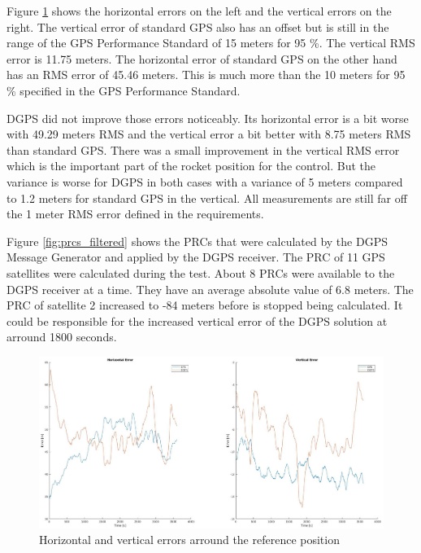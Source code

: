 Figure \ref{fig:horizontal_vertical_error} shows the horizontal errors on the left and the vertical errors on the right.
The vertical error of standard GPS also has an offset but is still in the range of the GPS Performance Standard \cite{SPS_Performance} of 15 meters for 95 \%.
The vertical RMS error is 11.75 meters.
The horizontal error of standard GPS on the other hand has an RMS error of 45.46 meters.
This is much more than the 10 meters for 95 \% specified in the GPS Performance Standard.

DGPS did not improve those errors noticeably.
Its horizontal error is a bit worse with 49.29 meters RMS and the vertical error a bit better with 8.75 meters RMS than standard GPS.
There was a small improvement in the vertical RMS error which is the important part of the rocket position for the control.
But the variance is worse for DGPS in both cases with a variance of 5 meters compared to 1.2 meters for standard GPS in the vertical.
All measurements are still far off the 1 meter RMS error defined in the requirements.

Figure \ref{fig:prcs_filtered} shows the PRCs that were calculated by the DGPS Message Generator and applied by the DGPS receiver.
The PRC of 11 GPS satellites were calculated during the test.
About 8 PRCs were available to the DGPS receiver at a time.
They have an average absolute value of 6.8 meters.
The PRC of satellite 2 increased to -84 meters before is stopped being calculated.
It could be responsible for the increased vertical error of the DGPS solution at arround 1800 seconds.

\begin{figure}[!h]
 \centering
 \includegraphics[height=0.4\textheight]{images/Horizontal_Vertical_Error.jpg}
 \caption{Horizontal and vertical errors arround the reference position}
 \label{fig:horizontal_vertical_error}
\end{figure}

